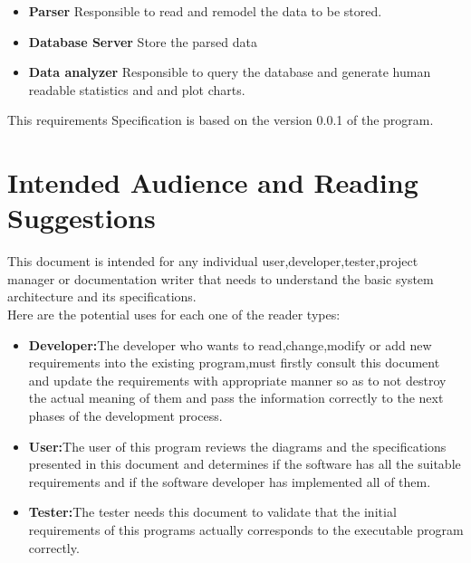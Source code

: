 \documentclass{scrreprt}
\begin{document}
\begin{itemize}
  \item \textbf{Parser} \- Responsible to read and remodel the data to be stored.
  \item \textbf{Database Server} \- Store the parsed data
  \item \textbf{Data analyzer} \- Responsible to query the database and generate
    human readable statistics and and plot charts.
\end{itemize}

This requirements Specification is based on the version 0.0.1 of the program.



 \section{Intended Audience and Reading Suggestions}
This document is intended for any individual user,developer,tester,project manager or
documentation writer that needs to understand the basic system architecture and its specifications.\\
Here are the potential uses for each one of the reader types:\\
\begin{itemize}

\item \textbf{Developer:}The developer who wants to read,change,modify or add new requirements into
the existing program,must firstly consult this document and update the requirements with
appropriate manner so as to not destroy the actual meaning of them and pass the information
correctly to the next phases of the development process.\\

\item \textbf{User:}The user of this program reviews the diagrams and the specifications presented in this
document and determines if the software has all the suitable requirements and if the software
developer has implemented all of them.\\

\item \textbf{Tester:}The tester needs this document to validate that the initial requirements of this
programs actually corresponds to the executable program correctly.\\

\end{itemize}
\end{document}
